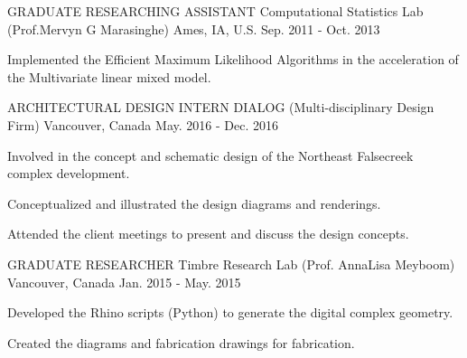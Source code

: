 

\begin{cventries}
    \cventry
      {GRADUATE RESEARCHING ASSISTANT} %
      {Computational Statistics Lab (Prof.Mervyn G Marasinghe)} %
      {Ames, IA, U.S.} %
      {Sep. 2011 - Oct. 2013} %
      {
        \begin{cvitems} %
          \item {Implemented the Efficient Maximum Likelihood Algorithms in the acceleration of the Multivariate linear mixed model.}
        \end{cvitems}
      }
  \cventry
    {ARCHITECTURAL DESIGN INTERN} %
    {DIALOG (Multi-disciplinary Design Firm)} %
    {Vancouver, Canada} %
    {May. 2016 - Dec. 2016} %
    {
      \begin{cvitems} %
        \item {Involved in the concept and schematic design of the Northeast Falsecreek complex development.}
        \item {Conceptualized and illustrated the design diagrams and renderings.}
        \item {Attended the client meetings to present and discuss the design concepts.}
      \end{cvitems}
    }

  \cventry
    {GRADUATE RESEARCHER} %
    {Timbre Research Lab (Prof. AnnaLisa Meyboom)} %
    {Vancouver, Canada} %
    {Jan. 2015 - May. 2015} %
    {
      \begin{cvitems} %
        \item {Developed the Rhino scripts (Python) to generate the digital complex geometry.}
        \item {Created the diagrams and fabrication drawings for fabrication.}
      \end{cvitems}
    }




\end{cventries}
